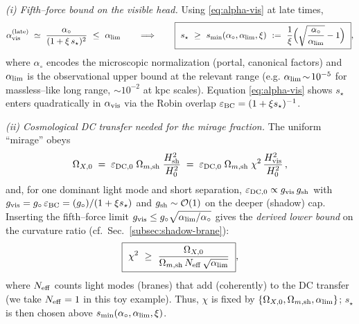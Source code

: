 \documentclass[10pt]{article}
\theoremstyle{definition}
\theoremstyle{plain}
\begin{document}
\smallskip
\emph{(i) Fifth–force bound on the visible head.} Using \eqref{eq:alpha-vis} at late times,
\[
\alpha_{\rm vis}^{\rm (late)}\;\simeq\;\frac{\alpha_\circ}{(1+\xi\,s_\star)^2}\ \le\ \alpha_{\rm lim}
\qquad\Longrightarrow\qquad
\boxed{\ s_\star\ \ge\ s_{\rm min}(\alpha_\circ,\alpha_{\rm lim},\xi)\ :=\ \frac{1}{\xi}\Big(\sqrt{\frac{\alpha_\circ}{\alpha_{\rm lim}}}-1\Big)\ },
\]
where \(\alpha_\circ\) encodes the microscopic normalization (portal, canonical factors) and \(\alpha_{\rm lim}\) is the observational
upper bound at the relevant range (e.g. \(\alpha_{\rm lim}\!\sim\!10^{-5}\) for massless–like long range, \(\sim 10^{-2}\) at
kpc scales). Equation \eqref{eq:alpha-vis} shows \(s_\star\) enters quadratically in \(\alpha_{\rm vis}\) via the Robin overlap
\(\varepsilon_{\rm BC}=(1+\xi s_\star)^{-1}\).

\smallskip
\emph{(ii) Cosmological DC transfer needed for the mirage fraction.} The uniform “mirage” obeys
\[
\Omega_{X,0}\;=\;\varepsilon_{\rm DC,0}\;\Omega_{m,{\rm sh}}\;\frac{H_{\rm sh}^2}{H_0^2}
\;=\;\varepsilon_{\rm DC,0}\;\Omega_{m,{\rm sh}}\;\chi^2\,\frac{H_{\rm vis}^2}{H_0^2}\,,
\]
and, for one dominant light mode and short separation, \(\varepsilon_{\rm DC,0}\propto g_{\rm vis}\,g_{\rm sh}\) with
\(g_{\rm vis}=g_\circ\,\varepsilon_{\rm BC}=(g_\circ)/(1+\xi s_\star)\) and \(g_{\rm sh}\sim\mathcal O(1)\) on the
deeper (shadow) cap. Inserting the fifth–force limit \(g_{\rm vis}\le g_\circ\sqrt{\alpha_{\rm lim}/\alpha_\circ}\) gives the
\emph{derived lower bound} on the curvature ratio (cf.\ Sec.~\ref{subsec:shadow-brane}):
\[
\boxed{\ \chi^2\ \ge\ \frac{\Omega_{X,0}}{\Omega_{m,{\rm sh}}\,N_{\rm eff}\,\sqrt{\alpha_{\rm lim}}}\ },
\]
where \(N_{\rm eff}\) counts light modes (branes) that add (coherently) to the DC transfer (we take \(N_{\rm eff}=1\) in this toy example).
Thus, \(\chi\) is fixed by \(\{\Omega_{X,0},\Omega_{m,{\rm sh}},\alpha_{\rm lim}\}\); \(s_\star\) is then chosen above
\(s_{\rm min}(\alpha_\circ,\alpha_{\rm lim},\xi)\).
\end{document}

